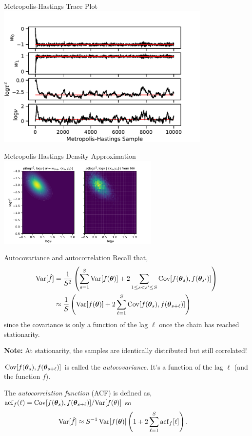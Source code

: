 \documentclass[aspectratio=169]{beamer}
\begin{document}
\begin{frame}{Metropolis-Hastings Trace Plot}
    \centering
    \includegraphics[width=0.8\textwidth]{figures/lap3/mh_traces.pdf}
\end{frame}

\begin{frame}{Metropolis-Hastings Density Approximation}
    \centering
    \includegraphics[width=0.6\textwidth]{figures/lap3/mh_nu_tausq_density.pdf}
\end{frame}

\begin{frame}{Autocovariance and autocorrelation}
Recall that,
\begin{align}
    \textrm{Var}[\hat{f}] 
    &= \frac{1}{S^2} \left( \sum_{s=1}^S \textrm{Var}[f(\boldsymbol{\theta})] + 2 \sum_{1 \leq s < s' \leq S} \mathrm{Cov} [f(\boldsymbol{\theta}_s),  f(\boldsymbol{\theta}_{s'})] \right) \\
    &\approx \frac{1}{S} \left(\textrm{Var}[f(\boldsymbol{\theta})] + 2\sum_{\ell=1}^{S} \mathrm{Cov} [f(\boldsymbol{\theta}_s),  f(\boldsymbol{\theta}_{s+\ell})] \right)
\end{align}
since the covariance is only a function of the lag $\ell$ once the chain has reached stationarity.

\textbf{Note:} At stationarity, the samples are identically distributed but still correlated!

$\mathrm{Cov} [f(\boldsymbol{\theta}_s),  f(\boldsymbol{\theta}_{s+\ell})] $ is called the \textit{autocovariance}. It's a function of the lag $\ell$ (and the function $f$).

The \textit{autocorrelation function} (ACF) is defined as, $\mathrm{acf}_f(\ell) = \mathrm{Cov} [f(\boldsymbol{\theta}_s),  f(\boldsymbol{\theta}_{s+\ell})] / \textrm{Var}[f(\theta)]$ so
\begin{align}
    \textrm{Var}[\hat{f}] 
    &\approx S^{-1} \, \textrm{Var}[f(\boldsymbol{\theta})] \left(1 + 2\sum_{\ell=1}^{S} \mathrm{acf}_f[\ell] \right).
\end{align}

\end{frame}
\end{document}
